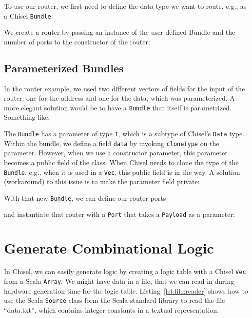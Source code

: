 \documentclass[%
    10pt,
    headinclude, footexclude,
    openright, %
    notitlepage,
    cleardoubleempty,
    headsepline,
    pointlessnumbers,
    bibtotoc, idxtotoc,
    ]{scrbook}
\newcommand{\code}[1]{{\small{\texttt{#1}}}}
\begin{document}

\noindent To use our router, we first need to define the data type we want to route, e.g.,
as a Chisel \code{Bundle}:


\noindent We create a router by passing an instance of the user-defined Bundle and
the number of ports to the constructor of the router:


\subsection{Parameterized Bundles}

In the router example, we used two different vectors of fields for the input
of the router: one for the address and one for the data, which was parameterized.
A more elegant solution would be to have a \code{Bundle} that itself
is parametrized. Something like:


The \code{Bundle} has a parameter of type \code{T}, which is a subtype
of Chisel's \code{Data} type.
Within the bundle, we define a field \code{data} by invoking \code{cloneType}
on the parameter.
However, when we use a constructor parameter, this parameter becomes a
public field of the class. When Chisel needs to clone the type of the \code{Bundle},
e.g., when it is used in a \code{Vec}, this public field is in the way.
A solution (workaround) to this issue is to make the parameter field private:


\noindent With that new \code{Bundle}, we can define our router ports


\noindent and instantiate that router with a \code{Port} that takes
a \code{Payload} as a parameter:



\section{Generate Combinational Logic}
\label{sec:gen:comb:logic}

In Chisel, we can easily generate logic by creating a logic table with
a Chisel \code{Vec} from a Scala \code{Array}.
We might have data in a file, that we can read in during hardware generation
time for the logic table.
Listing~\ref{lst:file:reader} shows how to use the Scala \code{Source}
class form the Scala standard library to read the file ``data.txt'', which
contains integer constants in a textual representation.
\end{document}
